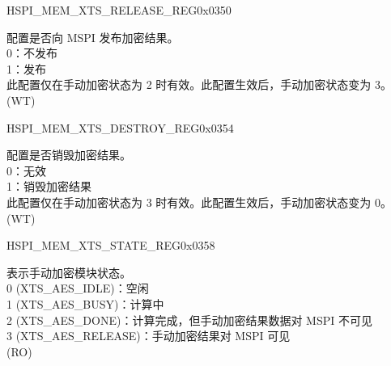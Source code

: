 \begin{register}{H}{SPI\_MEM\_XTS\_RELEASE\_REG}{0x0350}\label{regdesc:SPIMEMXTSRELEASEREG}
%
%
\regnewline%
\begin{regdesc}\begin{reglist}
\label{fielddesc:SPIMEMXTSRELEASE}\item [SPI\_MEM\_XTS\_RELEASE] 配置是否向 MSPI 发布加密结果。\\
0：不发布\\
1：发布\\
此配置仅在手动加密状态为 2 时有效。此配置生效后，手动加密状态变为 3。(WT)
\end{reglist}\end{regdesc}
\end{register}


\begin{register}{H}{SPI\_MEM\_XTS\_DESTROY\_REG}{0x0354}\label{regdesc:SPIMEMXTSDESTROYREG}
%
%
\regnewline%
\begin{regdesc}\begin{reglist}
\label{fielddesc:SPIMEMXTSDESTROY}\item [SPI\_MEM\_XTS\_DESTROY] 配置是否销毁加密结果。\\
0：无效\\
1：销毁加密结果\\
此配置仅在手动加密状态为 3 时有效。此配置生效后，手动加密状态变为 0。(WT)
\end{reglist}\end{regdesc}
\end{register}


\begin{register}{H}{SPI\_MEM\_XTS\_STATE\_REG}{0x0358}\label{regdesc:SPIMEMXTSSTATEREG}
%
%
\regnewline%
\begin{regdesc}\begin{reglist}
\label{fielddesc:SPIMEMXTSSTATE}\item [SPI\_MEM\_XTS\_STATE]
表示手动加密模块状态。\\
0 (XTS\_AES\_IDLE)：空闲\\
1 (XTS\_AES\_BUSY)：计算中\\
2 (XTS\_AES\_DONE)：计算完成，但手动加密结果数据对 MSPI 不可见\\
3 (XTS\_AES\_RELEASE)：手动加密结果对 MSPI 可见\\
(RO)
\end{reglist}\end{regdesc}
\end{register}

